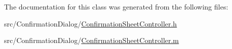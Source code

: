 The documentation for this class was generated from the following files\-:\begin{DoxyCompactItemize}
\item 
src/\-Confirmation\-Dialog/\hyperlink{_confirmation_sheet_controller_8h}{Confirmation\-Sheet\-Controller.\-h}\item 
src/\-Confirmation\-Dialog/\hyperlink{_confirmation_sheet_controller_8m}{Confirmation\-Sheet\-Controller.\-m}\end{DoxyCompactItemize}
